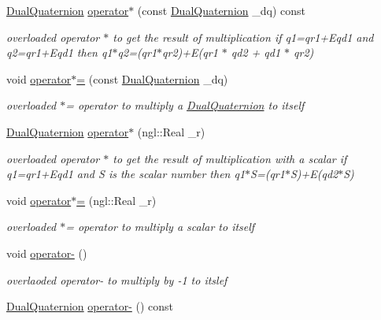 \begin{DoxyCompactItemize}
\hyperlink{class_dual_quaternion}{Dual\-Quaternion} \hyperlink{class_dual_quaternion_ab86045cf73a44fb12e163d56eba859ce}{operator$\ast$} (const \hyperlink{class_dual_quaternion}{Dual\-Quaternion} \-\_\-dq) const 
\begin{DoxyCompactList}\small\item\em overloaded operator $\ast$ to get the result of multiplication if q1=qr1+\-Eqd1 and q2=qr1+\-Eqd1 then q1$\ast$q2=(qr1$\ast$qr2)+\-E(qr1 $\ast$ qd2 + qd1 $\ast$ qr2) \end{DoxyCompactList}\item 
void \hyperlink{class_dual_quaternion_abb647d6995084ccf963d80cbdd13f051}{operator$\ast$=} (const \hyperlink{class_dual_quaternion}{Dual\-Quaternion} \-\_\-dq)
\begin{DoxyCompactList}\small\item\em overloaded $\ast$= operator to multiply a \hyperlink{class_dual_quaternion}{Dual\-Quaternion} to itself \end{DoxyCompactList}\item 
\hyperlink{class_dual_quaternion}{Dual\-Quaternion} \hyperlink{class_dual_quaternion_ac7d2a27162a9c34d6cad26793bab29b2}{operator$\ast$} (ngl\-::\-Real \-\_\-r)
\begin{DoxyCompactList}\small\item\em overloaded operator $\ast$ to get the result of multiplication with a scalar if q1=qr1+\-Eqd1 and S is the scalar number then q1$\ast$\-S=(qr1$\ast$\-S)+\-E(qd2$\ast$\-S) \end{DoxyCompactList}\item 
void \hyperlink{class_dual_quaternion_ab841ff4a7145b103ecb4f0bf7b23fa00}{operator$\ast$=} (ngl\-::\-Real \-\_\-r)
\begin{DoxyCompactList}\small\item\em overloaded $\ast$= operator to multiply a scalar to itself \end{DoxyCompactList}\item 
void \hyperlink{class_dual_quaternion_ad91de43de8c0f20e69e0f6c404717c58}{operator-\/} ()
\begin{DoxyCompactList}\small\item\em overlaoded operator-\/ to multiply by -\/1 to itslef \end{DoxyCompactList}\item 
\hyperlink{class_dual_quaternion}{Dual\-Quaternion} \hyperlink{class_dual_quaternion_a74dbe0263cb9705542df3cf994d80ba7}{operator-\/} () const 
\item 

\end{DoxyCompactItemize}
